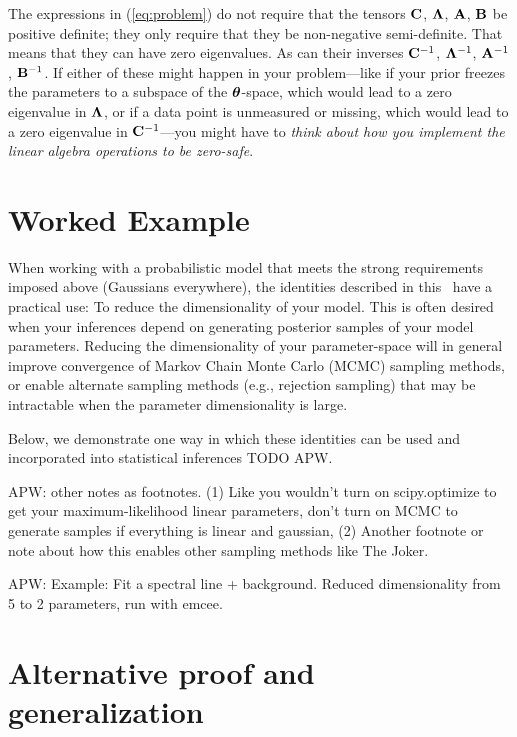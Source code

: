 The expressions in (\ref{eq:problem}) do not require that the tensors
$\mathbf{C}$, $\mathbf{\Lambda}$, $\mathbf{A}$, $\mathbf{B}$ be positive definite; they only require
that they be non-negative semi-definite.
That means that they can have zero eigenvalues.
As can their inverses $\mathbf{C}^{-1}$, $\mathbf{\Lambda}^{-1}$, $\mathbf{A}^{-1}$, $\mathbf{B}^{-1}$.
If either of these might happen in your problem---like if your prior
freezes the parameters to a subspace of the $\boldsymbol{\theta}$-space, which
would lead to a zero eigenvalue in $\mathbf{\Lambda}$, or if a data point is
unmeasured or missing, which would lead to a zero eigenvalue in
$\mathbf{C}^{-1}$---you might have to \emph{think about how you implement the
linear algebra operations to be zero-safe}.

\section{Worked Example}

When working with a probabilistic model that meets the strong requirements
imposed above (Gaussians everywhere), the identities described in this
\documentname\ have a practical use: To reduce the dimensionality of your model.
This is often desired when your inferences depend on generating posterior
samples of your model parameters.
Reducing the dimensionality of your parameter-space will in general improve
convergence of Markov Chain Monte Carlo (MCMC) sampling methods, or enable
alternate sampling methods (e.g., rejection sampling) that may be intractable
when the parameter dimensionality is large.

Below, we demonstrate one way in which these identities can be used and
incorporated into statistical inferences TODO APW.

APW: other notes as footnotes. (1) Like you wouldn't turn on scipy.optimize to get your maximum-likelihood linear parameters, don't turn on MCMC to generate samples if everything is linear and gaussian, (2) Another footnote or note about how this enables other sampling methods like The Joker.

APW: Example: Fit a spectral line + background. Reduced dimensionality from 5 to 2 parameters, run with emcee.

\section{Alternative proof and generalization}

